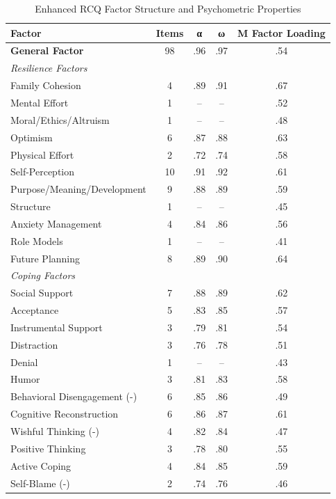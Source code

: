 \documentclass[12pt,a4paper]{article}
\begin{document}
\begin{table}[ht]
\centering
\caption{Enhanced RCQ Factor Structure and Psychometric Properties}
\label{tab:factor-structure}
\begin{tabular}{lcccc}
\toprule
Factor & Items & α & ω & M Factor Loading \\
\midrule
\textbf{General Factor} & 98 & .96 & .97 & .54 \\
\midrule
\multicolumn{5}{l}{\textit{Resilience Factors}} \\
Family Cohesion & 4 & .89 & .91 & .67 \\
Mental Effort & 1 & -- & -- & .52 \\
Moral/Ethics/Altruism & 1 & -- & -- & .48 \\
Optimism & 6 & .87 & .88 & .63 \\
Physical Effort & 2 & .72 & .74 & .58 \\
Self-Perception & 10 & .91 & .92 & .61 \\
Purpose/Meaning/Development & 9 & .88 & .89 & .59 \\
Structure & 1 & -- & -- & .45 \\
Anxiety Management & 4 & .84 & .86 & .56 \\
Role Models & 1 & -- & -- & .41 \\
Future Planning & 8 & .89 & .90 & .64 \\
\midrule
\multicolumn{5}{l}{\textit{Coping Factors}} \\
Social Support & 7 & .88 & .89 & .62 \\
Acceptance & 5 & .83 & .85 & .57 \\
Instrumental Support & 3 & .79 & .81 & .54 \\
Distraction & 3 & .76 & .78 & .51 \\
Denial & 1 & -- & -- & .43 \\
Humor & 3 & .81 & .83 & .58 \\
Behavioral Disengagement (-) & 6 & .85 & .86 & .49 \\
Cognitive Reconstruction & 6 & .86 & .87 & .61 \\
Wishful Thinking (-) & 4 & .82 & .84 & .47 \\
Positive Thinking & 3 & .78 & .80 & .55 \\
Active Coping & 4 & .84 & .85 & .59 \\
Self-Blame (-) & 2 & .74 & .76 & .46 \\
\bottomrule
\end{tabular}
\end{table}
\end{document}
